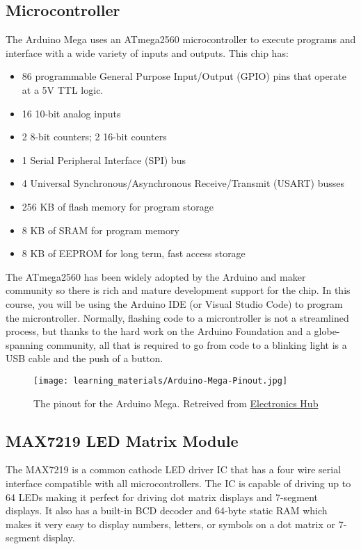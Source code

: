     \subsection*{Microcontroller}
    The Arduino Mega uses an ATmega2560 microcontroller to execute programs and interface with a wide variety of inputs and outputs.
    This chip has:
    \begin{itemize}
        \item 86 programmable General Purpose Input/Output (GPIO) pins that operate at a 5V TTL logic.
        \item 16 10-bit analog inputs
        \item 2 8-bit counters; 2 16-bit counters
        \item 1 Serial Peripheral Interface (SPI) bus
        \item 4 Universal Synchronous/Asynchronous Receive/Transmit (USART) busses
        \item 256 KB of flash memory for program storage
        \item 8 KB of SRAM for program memory
        \item 8 KB of EEPROM for long term, fast access storage
    \end{itemize}

    The ATmega2560 has been widely adopted by the Arduino and maker community so there is rich and mature development support for the chip.
    In this course, you will be using the Arduino IDE (or Visual Studio Code) to program the microntroller. 
    Normally, flashing code to a microntroller is not a streamlined process, but thanks to the hard work on the Arduino Foundation and a globe-spanning community, all that is required to go from code to a blinking light is a USB cable and the push of a button.

    \begin{figure*}[h!]
        \texttt{[image: learning\_materials/Arduino-Mega-Pinout.jpg]}
        \caption[Arduino Mega Pinout]{The pinout for the Arduino Mega. Retreived from \href{https://www.electronicshub.org/wp-content/uploads/2021/01/Arduino-Mega-Pinout.jpg}{Electronics Hub}}
    \end{figure*}

    \subsection*{MAX7219 LED Matrix Module}
    The MAX7219 is a common cathode LED driver IC that has a four wire serial interface compatible with all microcontrollers.
    The IC is capable of driving up to 64 LEDs making it perfect for driving dot matrix displays and 7-segment displays.
    It also has a built-in BCD decoder and 64-byte static RAM which makes it very easy to display numbers, letters, or symbols on a dot matrix or 7-segment display.

